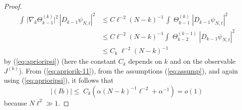 \documentclass[11pt]{article}
\renewcommand{\a}{\alpha}
\begin{document}
\begin{proof}
\begin{equation}
\begin{split}
\int   \, \Big|\nabla_k \Theta_{k-1}^{(k)}  \Big|^2 \,
|D_{k-1}  \psi_{N,t} |^2  &\leq C \ell^{-2} (N-k)^{-1} \, \int
 \;
\Theta_{k-1}^{(k)}  \; | D_{k-1}  \psi_{N,t} |^2 \\
&\leq C \ell^{-2} (N-k)^{-1} \int  \; \Theta_{k-2}^{(k-1)}
 \; | D_{k-1}  \psi_{N,t} |^2 \\ &\leq C_k \; \ell^{-2}
(N-k)^{-1}
\end{split}
\end{equation}
by (\ref{eq:aprioripsi}) (here the constant $C_k$ depends on $k$ and
on the observable $J^{(k)}$). {F}rom (\ref{eq:apriorik-11}), from
the assumptions (\ref{eq:assump}), and again using
(\ref{eq:aprioripsi}), it follows that
\begin{equation}\label{eq:apriorik-13}
|(Ib)| \leq \; C_k \left( \a (N-k)^{-1} \ell^{-2} + \a^{-1} \right)
= o(1)
\end{equation}
because $N \ell^2 \gg 1$.


\end{proof}
\end{document}
